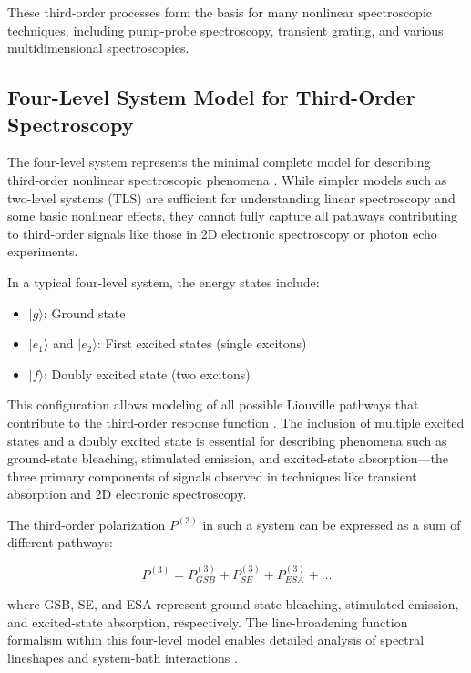 \noindent These third-order processes form the basis for many nonlinear spectroscopic techniques, including pump-probe spectroscopy, transient grating, and various multidimensional spectroscopies.

\subsection{Four-Level System Model for Third-Order Spectroscopy}
\label{subsec:four_level_model}

\noindent The four-level system represents the minimal complete model for describing third-order nonlinear spectroscopic phenomena \cite{Cho2009, Abramavicius2009}. While simpler models such as two-level systems (TLS) are sufficient for understanding linear spectroscopy and some basic nonlinear effects, they cannot fully capture all pathways contributing to third-order signals like those in 2D electronic spectroscopy or photon echo experiments.

\noindent In a typical four-level system, the energy states include:

\begin{itemize}
    \item $|g\rangle$: Ground state
    \item $|e_1\rangle$ and $|e_2\rangle$: First excited states (single excitons)
    \item $|f\rangle$: Doubly excited state (two excitons)
\end{itemize}

\noindent This configuration allows modeling of all possible Liouville pathways that contribute to the third-order response function \cite{Mukamel2000}. The inclusion of multiple excited states and a doubly excited state is essential for describing phenomena such as ground-state bleaching, stimulated emission, and excited-state absorption—the three primary components of signals observed in techniques like transient absorption and 2D electronic spectroscopy.

\noindent The third-order polarization $P^{(3)}$ in such a system can be expressed as a sum of different pathways:

\begin{equation}
    P^{(3)} = P^{(3)}_{GSB} + P^{(3)}_{SE} + P^{(3)}_{ESA} + \ldots
    \label{eq:third_order_contributions}
\end{equation}

\noindent where GSB, SE, and ESA represent ground-state bleaching, stimulated emission, and excited-state absorption, respectively. The line-broadening function formalism within this four-level model enables detailed analysis of spectral lineshapes and system-bath interactions \cite{Cho2009, Abramavicius2009}.

